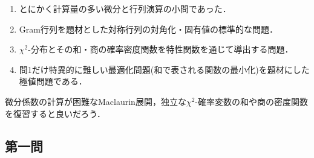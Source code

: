 \documentclass[uplatex,dvipdfmx]{jsarticle}
\begin{document}
\begin{tcolorbox}[colframe=ForestGreen, colback=ForestGreen!10!white,breakable,colbacktitle=ForestGreen!40!white,coltitle=black,fonttitle=\bfseries\sffamily,
    title=概観]
    \begin{enumerate}[{第}1{問}]
        \item とにかく計算量の多い微分と行列演算の小問であった．
        \item Gram行列を題材とした対称行列の対角化・固有値の標準的な問題．
        \item $\chi^2$-分布とその和・商の確率密度関数を特性関数を通じて導出する問題．
        \item 問1だけ特異的に難しい最適化問題(和で表される関数の最小化)を題材にした極値問題である．
    \end{enumerate}
    微分係数の計算が困難なMaclaurin展開，独立な$\chi^2$-確率変数の和や商の密度関数を復習すると良いだろう．
\end{tcolorbox}

\subsection{第一問}
\end{document}
